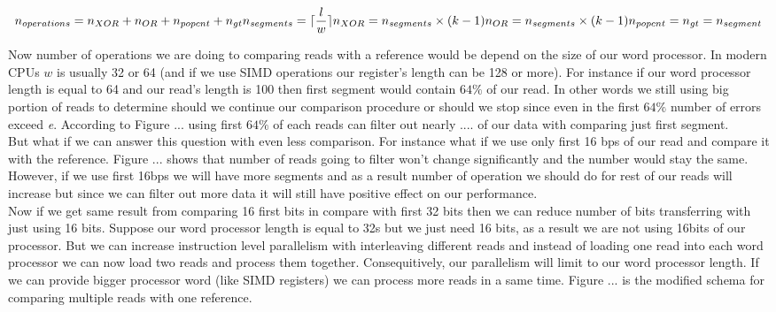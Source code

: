 \begin{equation}
\nonumber
n_{operations} = n_{XOR} + n_{OR} + n_{popcnt} + n_{gt} \\


n_{segments} =  \lceil \frac{l}{w} \rceil \\


n_{XOR} = n_{segments} \times (k-1) \\


n_{OR} = n_{segments} \times (k-1) \\


n_{popcnt} = n_{gt} = n_{segment} \\

\end{equation}  
  
Now number of operations we are doing to comparing reads with a reference would be depend on the size of our word processor. In modern CPUs $w$ is usually 32 or 64 (and if we use SIMD operations our register's length can be 128 or more). For instance if our word processor length is equal to 64 and our read's length is 100 then first segment would contain $64\%$ of our read. In other words we still using big portion of reads to determine should we continue our comparison procedure or should we stop since even in the first $64\%$ number of errors exceed \emph{e}. According to Figure ... using first $64\%$ of each reads can filter out nearly .... of our data with comparing just first segment.\\
But what if we can answer this question with even less comparison. For instance what if we use only first 16 bps of our read and compare it with the reference. Figure ... shows that number of reads going to filter won't change significantly and the number would stay the same. However, if we use first 16bps we will have more segments and as a result number of operation we should do for rest of our reads will increase but since we can filter out more data it will still have positive effect on our performance.\\
Now if we get same result from comparing 16 first bits in compare with first 32 bits then we can reduce number of bits transferring with just using 16 bits. Suppose our word processor length is equal to 32s but we just need 16 bits, as a result we are not using 16bits of our processor. But we can increase instruction level parallelism with interleaving different reads and instead of loading one read into each word processor we can now load two reads and process them together. Consequitively, our parallelism will limit to our word processor length. If we can provide bigger processor word (like SIMD registers) we can process more reads in a same time. Figure ... is the modified schema for comparing multiple reads with one reference. \\
  
